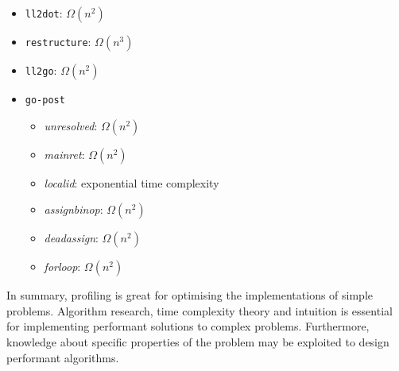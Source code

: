 \begin{itemize}
	\item \texttt{ll2dot}: $ \Omega(n^{2}) $
	\item \texttt{restructure}: $ \Omega(n^{3}) $
	\item \texttt{ll2go}: $ \Omega(n^{2}) $
	\item \texttt{go-post}
	\begin{itemize}
		\item \textit{unresolved}: $ \Omega(n^{2}) $
		\item \textit{mainret}: $ \Omega(n^{2}) $
		\item \textit{localid}: exponential time complexity
		\item \textit{assignbinop}: $ \Omega(n^{2}) $
		\item \textit{deadassign}: $ \Omega(n^{2}) $
		\item \textit{forloop}: $ \Omega(n^{2}) $
	\end{itemize}
\end{itemize}

In summary, profiling is great for optimising the implementations of simple problems. Algorithm research, time complexity theory and intuition is essential for implementing performant solutions to complex problems. Furthermore, knowledge about specific properties of the problem may be exploited to design performant algorithms.




